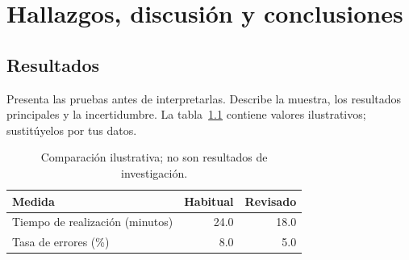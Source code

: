 \chapter{Hallazgos, discusión y conclusiones}
\label{ch:findings}
\section{Resultados}
Presenta las pruebas antes de interpretarlas. Describe la muestra, los resultados
principales y la incertidumbre. La tabla~\ref{tab:outcomes} contiene valores
ilustrativos; sustitúyelos por tus datos.
\begin{table}[htbp]
\centering
\caption{Comparación ilustrativa; no son resultados de investigación.}
\label{tab:outcomes}
\begin{tabularx}{\linewidth}{@{}Xrr@{}}
\toprule
\textbf{Medida} & \textbf{Habitual} & \textbf{Revisado}\\
\midrule
Tiempo de realización (minutos) & 24.0 & 18.0\\
Tasa de errores (\%) & 8.0 & 5.0\\
\bottomrule
\end{tabularx}
\end{table}
